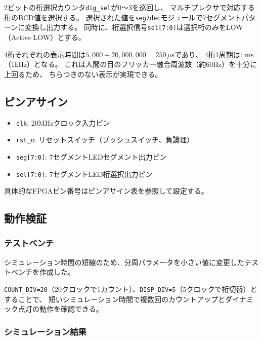 \documentclass[a4paper,11pt]{ltjsarticle}
\begin{document}
2ビットの桁選択カウンタ\texttt{dig\_sel}が0〜3を巡回し、
マルチプレクサで対応する桁のBCD値を選択する。
選択された値を\texttt{seg7dec}モジュールで7セグメントパターンに変換し出力する。
同時に、桁選択信号\texttt{sel[7:0]}は選択桁のみをLOW（Active LOW）とする。

4桁それぞれの表示時間は$5{,}000 \div 20{,}000{,}000 = 250\,\mu\mathrm{s}$であり、
4桁1周期は$1\,\mathrm{ms}$（1kHz）となる。
これは人間の目のフリッカー融合周波数（約60Hz）を十分に上回るため、
ちらつきのない表示が実現できる。

\subsection{ピンアサイン}

\begin{itemize}
\item \texttt{clk}: 20MHzクロック入力ピン
\item \texttt{rst\_n}: リセットスイッチ（プッシュスイッチ、負論理）
\item \texttt{seg[7:0]}: 7セグメントLEDセグメント出力ピン
\item \texttt{sel[7:0]}: 7セグメントLED桁選択出力ピン
\end{itemize}

具体的なFPGAピン番号はピンアサイン表を参照して設定する。

\subsection{動作検証}

\subsubsection{テストベンチ}

シミュレーション時間の短縮のため、分周パラメータを小さい値に変更したテストベンチを作成した。



\texttt{COUNT\_DIV=20}（20クロックで1カウント）、\texttt{DISP\_DIV=5}（5クロックで桁切替）とすることで、
短いシミュレーション時間で複数回のカウントアップとダイナミック点灯の動作を確認できる。

\subsubsection{シミュレーション結果}
\end{document}
